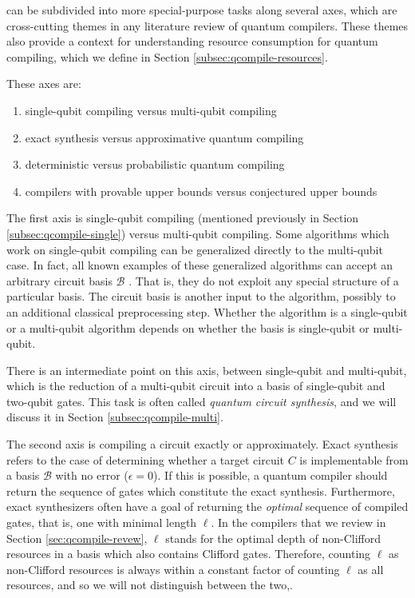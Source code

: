 can be subdivided into more special-purpose tasks along several axes,
which are cross-cutting themes in any literature review of quantum compilers.
These themes also provide a context for understanding resource consumption
for quantum compiling, which we define in Section \ref{subsec:qcompile-resources}.

These axes are:

\begin{enumerate}
\item single-qubit compiling versus multi-qubit compiling
\item exact synthesis versus approximative quantum compiling
\item deterministic versus probabilistic quantum compiling
\item compilers with provable upper bounds versus conjectured upper bounds
\end{enumerate}

The first axis is 
single-qubit compiling
(mentioned previously in Section \ref{subsec:qcompile-single}) versus
multi-qubit compiling. Some algorithms which work on single-qubit compiling
can be generalized directly to the multi-qubit case. In fact, all known
examples of these generalized algorithms can accept an arbitrary circuit
basis $\mathcal{B}$ \cite{Amy2012,Solovay1995,Fowler2011,Booth2012}.
That is, they do not exploit any special structure of
a particular basis. The circuit basis is another input to the algorithm,
possibly to an additional classical preprocessing step. Whether the algorithm
is a single-qubit or a multi-qubit algorithm depends on whether the basis
is single-qubit or multi-qubit.

There is an intermediate point on this axis, between single-qubit and multi-qubit,
which is the reduction of a multi-qubit circuit into a basis of
single-qubit and two-qubit gates. This task is often called \emph{quantum circuit synthesis},
and we will discuss it in Section \ref{subsec:qcompile-multi}.

The second axis is compiling a circuit exactly or approximately.
Exact synthesis refers to the case of determining whether a
target circuit $C$ is implementable from a basis $\mathcal{B}$
with no error ($\epsilon = 0$). If this is possible, a quantum compiler
should return the sequence of gates which constitute the exact
synthesis. Furthermore, exact synthesizers often have a goal of
returning the \emph{optimal} sequence of compiled gates, that is,
one with minimal length $\ell$. In the compilers that we review
in Section \ref{sec:qcompile-revew}, $\ell$ stands for the optimal
depth of non-Clifford resources in a basis which also contains Clifford
gates. Therefore, counting $\ell$ as non-Clifford resources is always
within a constant factor of counting $\ell$ as all resources, and so we
will not distinguish between the two,.

